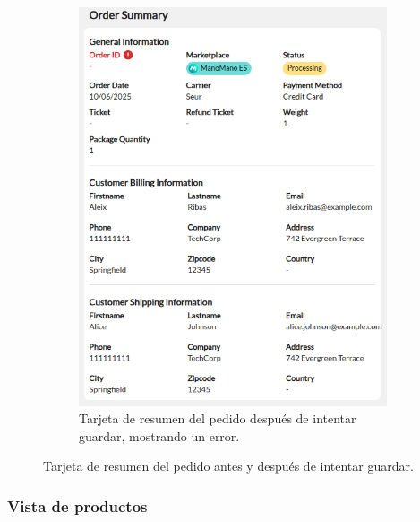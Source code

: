 \begin{figure}[H]
\begin{subfigure}{0.45\linewidth}
        \includegraphics[width=\linewidth]{figures/design_develop/screenshots/tarjeta_resumen_despues_guardar.png}
        \caption{Tarjeta de resumen del pedido después de intentar guardar, mostrando un error.}
    \end{subfigure}
    \par\vspace{0.3cm}
    \caption{Tarjeta de resumen del pedido antes y después de intentar guardar.}
    \label{fig:dev:ss:tarjeta_resumen_pedido}
\end{figure}

\subsubsection{Vista de productos}
\label{dev:subsubsec:vista_productos}

